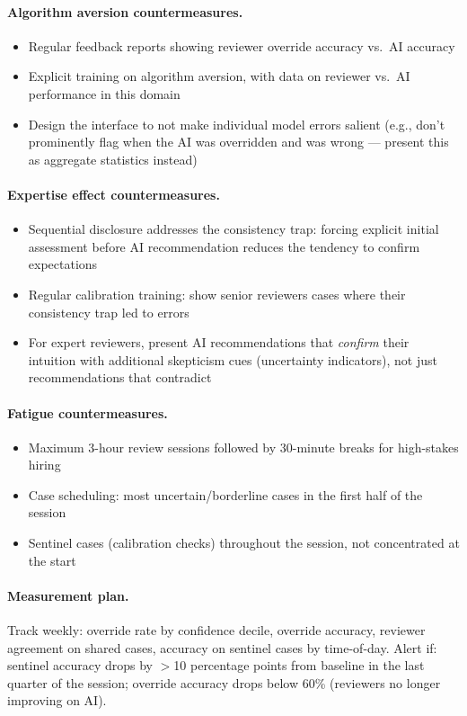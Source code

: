 \paragraph{Algorithm aversion countermeasures.}
\begin{itemize}
    \item Regular feedback reports showing reviewer override accuracy vs.\ AI accuracy
    \item Explicit training on algorithm aversion, with data on reviewer vs.\ AI performance in this domain
    \item Design the interface to not make individual model errors salient (e.g., don't prominently flag when the AI was overridden and was wrong --- present this as aggregate statistics instead)
\end{itemize}

\paragraph{Expertise effect countermeasures.}
\begin{itemize}
    \item Sequential disclosure addresses the consistency trap: forcing explicit initial assessment before AI recommendation reduces the tendency to confirm expectations
    \item Regular calibration training: show senior reviewers cases where their consistency trap led to errors
    \item For expert reviewers, present AI recommendations that \emph{confirm} their intuition with additional skepticism cues (uncertainty indicators), not just recommendations that contradict
\end{itemize}

\paragraph{Fatigue countermeasures.}
\begin{itemize}
    \item Maximum 3-hour review sessions followed by 30-minute breaks for high-stakes hiring
    \item Case scheduling: most uncertain/borderline cases in the first half of the session
    \item Sentinel cases (calibration checks) throughout the session, not concentrated at the start
\end{itemize}

\paragraph{Measurement plan.}
Track weekly: override rate by confidence decile, override accuracy, reviewer agreement on shared cases, accuracy on sentinel cases by time-of-day. Alert if: sentinel accuracy drops by $>$10 percentage points from baseline in the last quarter of the session; override accuracy drops below 60\% (reviewers no longer improving on AI).

